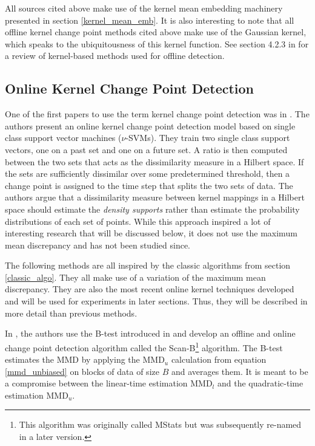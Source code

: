 All sources cited above make use of the kernel mean embedding machinery presented in section \ref{kernel_mean_emb}. It is also interesting to note that all offline kernel change point methods cited above make use of the Gaussian kernel, which speaks to the ubiquitousness of this kernel function. See section 4.2.3  in \cite{truong2018review} for a review of kernel-based methods used for offline detection. 

\subsection{Online Kernel Change Point Detection}
One of the first papers to use the term kernel change point detection was in \cite{desobry2005online}. The authors present an online kernel change point detection model based on single class support vector machines ($\nu$-SVMs). They train two single class support vectors, one on a past set and one on a future set. A ratio is then computed between the two sets that acts as the dissimilarity measure in a Hilbert space. If the sets are sufficiently dissimilar over some predetermined threshold, then a change point is assigned to the time step that splits the two sets of data. The authors argue that a dissimilarity measure between kernel mappings in a Hilbert space should estimate the \textit{density supports} rather than estimate the probability distributions of each set of points. While this approach inspired a lot of interesting research that will be discussed below, it does not use the maximum mean discrepancy and has not been studied since.

The following methods are all inspired by the classic algorithms from section \ref{classic_algo}. They all make use of a variation of the maximum mean discrepancy. They are also the most recent online kernel techniques developed and will be used for experiments in later sections. Thus, they will be described in more detail than previous methods.

In  \cite{li2015m}, the authors use the B-test introduced in \cite{zaremba2013b} and develop an offline and online change point detection algorithm called the Scan-B\footnote{This algorithm was originally called MStats but was subsequently re-named in a later version.} algorithm. The B-test estimates the MMD by applying the MMD$_u$ calculation from equation \ref{mmd_unbiased} on blocks of data of size $B$ and averages them. It is meant to be a compromise between the linear-time estimation MMD$_l$ and the quadratic-time estimation MMD$_u$.

